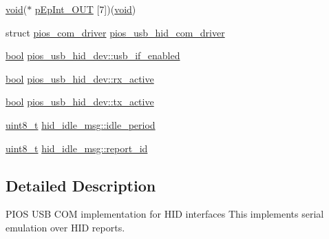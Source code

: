 \begin{DoxyCompactItemize}
\item 
\hyperlink{group___n_a_m_e_ga18028b8badbf1ea7e704ccac3c488e82}{void}($\ast$ \hyperlink{group___p_i_o_s___u_s_b___h_i_d_ga549396ff4348c565f52117dd27ad52ca}{p\-Ep\-Int\-\_\-\-O\-U\-T} \mbox{[}7\mbox{]})(\hyperlink{group___n_a_m_e_ga18028b8badbf1ea7e704ccac3c488e82}{void})
\item 
struct \hyperlink{structpios__com__driver}{pios\-\_\-com\-\_\-driver} \hyperlink{group___p_i_o_s___u_s_b___h_i_d_ga7bc5f832e095cad60f463436e377bb5d}{pios\-\_\-usb\-\_\-hid\-\_\-com\-\_\-driver}
\item 
\hyperlink{group___exported__types_gaf6a258d8f3ee5206d682d799316314b1}{bool} \hyperlink{group___p_i_o_s___u_s_b___h_i_d_ga545cdf4f2c93727b458fa26bf4426311}{pios\-\_\-usb\-\_\-hid\-\_\-dev\-::usb\-\_\-if\-\_\-enabled}
\item 
\hyperlink{group___exported__types_gaf6a258d8f3ee5206d682d799316314b1}{bool} \hyperlink{group___p_i_o_s___u_s_b___h_i_d_gaf4ed0035b90313acf78fada97b2ff2f5}{pios\-\_\-usb\-\_\-hid\-\_\-dev\-::rx\-\_\-active}
\item 
\hyperlink{group___exported__types_gaf6a258d8f3ee5206d682d799316314b1}{bool} \hyperlink{group___p_i_o_s___u_s_b___h_i_d_ga3c0deaac64c0f63bdb4a5cd41379bc23}{pios\-\_\-usb\-\_\-hid\-\_\-dev\-::tx\-\_\-active}
\item 
\hyperlink{stdint_8h_aba7bc1797add20fe3efdf37ced1182c5}{uint8\-\_\-t} \hyperlink{group___p_i_o_s___u_s_b___h_i_d_ga6f939e967dc4622730a02a7d467edf7a}{hid\-\_\-idle\-\_\-msg\-::idle\-\_\-period}
\item 
\hyperlink{stdint_8h_aba7bc1797add20fe3efdf37ced1182c5}{uint8\-\_\-t} \hyperlink{group___p_i_o_s___u_s_b___h_i_d_gae36ecdd57567fb6f4ee28b3130b3c8ee}{hid\-\_\-idle\-\_\-msg\-::report\-\_\-id}
\end{DoxyCompactItemize}


\subsection{Detailed Description}
P\-I\-O\-S U\-S\-B C\-O\-M implementation for H\-I\-D interfaces  This implements serial emulation over H\-I\-D reports. 


